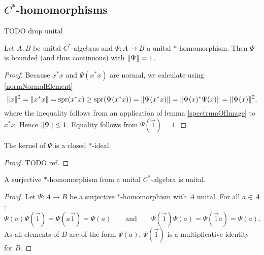\subsection{$C^*$-homomorphisms}
TODO drop unital
\begin{proposition}
Let $A,B$ be unital $C^*$-algebras and $\Psi: A\to B$ a unital $*$-homomorphism. Then $\Psi$ is bounded (and thus continuous) with $\lVert\Psi\rVert = 1$.
\end{proposition}
\begin{proof}
Because $x^*x$ and $\Psi(x^*x)$ are normal, we calculate using \ref{normNormalElement}
\[ \lVert x\rVert^2 = \lVert x^*x\rVert = \operatorname{spr}(x^*x) \geq \operatorname{spr}(\Psi(x^*x)) = \lVert\Psi(x^*x)\rVert = \lVert\Psi(x)^*\Psi(x)\rVert = \lVert\Psi(x)\rVert^2, \]
where the inequality follows from an application of lemma \ref{spectrumOfImage} to $x^*x$. Hence $\lVert\Psi\rVert\leq 1$. Equality follows from $\Psi(\vec{1}) = 1$.
\end{proof}
\begin{corollary}
The kernel of $\Psi$ is a closed $*$-ideal.
\end{corollary}
\begin{proof}
TODO ref.
\end{proof}

\begin{lemma}
A surjective $*$-homomorphism from a unital $C^*$-algebra is unital.
\end{lemma}
\begin{proof}
Let $\Psi: A \to B$ be a surjective $*$-homomorphism with $A$ unital. For all $a\in A$:
\[ \Psi(a)\Psi(\vec{1}) = \Psi(a \vec{1}) = \Psi(a) \qquad \text{and} \qquad \Psi(\vec{1})\Psi(a) = \Psi(\vec{1} a) = \Psi(a). \]
As all elements of $B$ are of the form $\Psi(a)$, $\Psi(\vec{1})$ is a multiplicative identity for $B$.
\end{proof}

